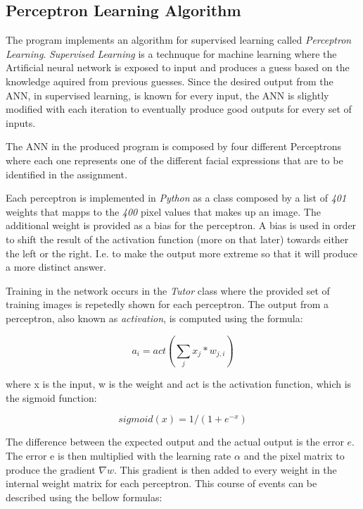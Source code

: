 \documentclass[12pt]{article}
\begin{document}
\subsection {Perceptron Learning Algorithm} 

The program implements an algorithm for supervised learning called
\textit{Perceptron Learning}. \textit{Supervised Learning} is a technuque for
machine learning where the Artificial neural network is exposed to input and
produces a guess based on the knowledge aquired from previous guesses. Since the
desired output from the ANN, in supervised learning, is known for every input,
the ANN is slightly modified with each iteration to eventually produce good
outputs for every set of inputs.

The ANN in the produced program is composed by four different Perceptrons
where each one represents one of the different facial expressions that are
to be identified in the assignment.

Each perceptron is implemented in \textit{Python} as a class composed by a
list of \textit{401} weights that mapps to the \textit{400} pixel values
that makes up an image. The additional weight is provided as a bias for
the perceptron. A bias is used in order to shift the result of the activation
function (more on that later) towards either the left or the right. I.e.
to make the output more extreme so that it will produce a more distinct
answer.

Training in the network occurs in the \textit{Tutor} class where the provided
set of training images is repetedly shown for each perceptron. The output
from a perceptron, also known as \textit{activation}, is computed using
the formula:

\begin{equation*}
  a_i = act(\sum_j x_j*w_{j,i})
\end{equation*}

where x is the input, w is the weight and act is the activation function,
which is the sigmoid function:

\begin{equation*}
sigmoid(x) = 1/(1+e^{-x})
\end{equation*}


The difference between the expected output and the actual output is the
error $e$. The error e is then multiplied with the learning rate $\alpha$
and the pixel matrix to produce the gradient $\nabla w$. This
gradient is then added to every weight in the internal weight matrix for each
perceptron. This course of events can be described using the bellow formulas:
\end{document}
